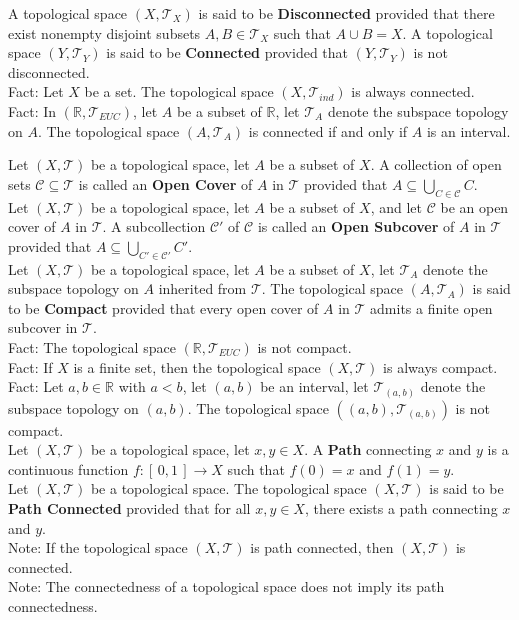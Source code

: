 \documentclass[11pt]{article}
\newcommand{\R}{\mathbb{R}}
\newcommand{\T}{\mathcal{T}}
\newcommand{\C}{\mathcal{C}}
\newcommand{\note}{\color{gray}Note: \color{black}}
\newcommand{\fact}{\color{gray}Fact: \color{black}}
\begin{document}
		\noindent A topological space $(X,\T_X)$ is said to be \textbf{Disconnected} provided that there exist nonempty disjoint subsets $A,B \in \T_X$ such that $A \cup B = X$. A topological space $(Y,\T_Y)$ is said to be \textbf{Connected} provided that $(Y,\T_Y)$ is not disconnected.\\
		\fact Let $X$ be a set. The topological space $(X,\T_{ind})$ is always connected.\\
		\fact In $(\R,\T_{EUC})$, let $A$ be a subset of $\R$, let $\T_A$ denote the subspace topology on $A$. The topological space $(A,\T_A)$ is connected if and only if $A$ is an interval.\\
		

\clearpage
		
				
		\noindent Let $(X,\T)$ be a topological space, let $A$ be a subset of $X$. A collection of open sets $\C \subseteq \T$ is called an \textbf{Open Cover} of $A$ in $\T$ provided that $A \subseteq \bigcup_{C \in \C} C$.\\
		
		\noindent Let $(X,\T)$ be a topological space, let $A$ be a subset of $X$, and let $\C$ be an open cover of $A$ in $\T$. A subcollection $\C '$ of $\C$ is called an \textbf{Open Subcover} of $A$ in $\T$ provided that $A \subseteq \bigcup_{C' \in \C'}C'$.\\
		
		\noindent Let $(X,\T)$ be a topological space, let $A$ be a subset of $X$, let $\T_A$ denote the subspace topology on $A$ inherited from $\T$. The topological space $(A,\T_A)$ is said to be \textbf{Compact} provided that every open cover of $A$ in $\T$ admits a finite open subcover in $\T$.\\
		\fact The topological space $(\R,\T_{EUC})$ is not compact.\\	
		\fact If $X$ is a finite set, then the topological space $(X,\T)$ is always compact.\\	
		\fact Let $a,b \in \R$ with $a<b$, let $(a,b)$ be an interval, let $\T_{(a,b)}$ denote the subspace topology on $(a,b)$. The topological space $((a,b),\T_{(a,b)})$ is not compact.\\
		
		\noindent Let $(X,\T)$ be a topological space, let $x,y \in X$. A \textbf{Path} connecting $x$ and $y$ is a continuous function $f:[\, 0,1 \, ] \to X$ such that $f(0)=x$ and $f(1)=y$.\\

		
		\noindent Let $(X,\T)$ be a topological space. The topological space $(X,\T)$ is said to be \textbf{Path Connected} provided that for all $x,y \in X$, there exists a path connecting $x$ and $y$.\\
		\note If the topological space $(X,\T)$ is path connected, then $(X,\T)$ is connected.\\
		\note The connectedness of a topological space does not imply its path connectedness.\\
		
\end{document}
